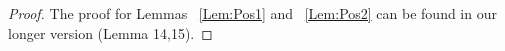\begin{proof}
	The proof for Lemmas ~\ref{Lem:Pos1} and ~\ref{Lem:Pos2} can be found in our longer version\cite{janakiraman2017sub} (Lemma 14,15).
\end{proof}
%	
%	
%	
%	
%	
%	
